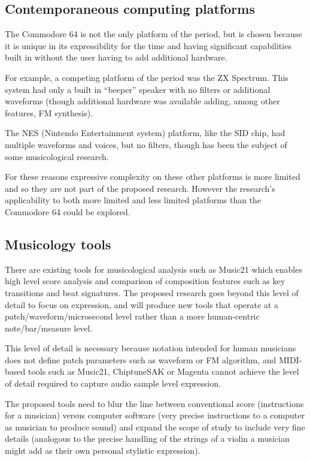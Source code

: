 \documentclass[10pt]{article}
\begin{document}
\begin{multicols*}{2}
\subsection{Contemporaneous computing platforms}

The Commodore 64 is not the only platform of the period, but is chosen because it is unique in its expressibility for the time and having significant capabilities built in without the user having to add additional hardware.

For example, a competing platform of the period was the ZX Spectrum\cite{attrclash}. This system had only a built in “beeper” speaker with no filters or additional waveforms (though additional hardware was available adding, among other features, FM synthesis).

The NES (Nintendo Entertainment system) platform, like the SID chip, had multiple waveforms and voices, but no filters, though has been the subject of some musicological research\cite{nesmusic}.

For these reasons expressive complexity on these other platforms is more limited and so they are not part of the proposed research. However the research's applicability to both more limited and less limited platforms than the Commodore 64 could be explored.

\subsection{Musicology tools}

There are existing tools for musicological analysis such as Music21\cite{music21} which enables high level score analysis and comparison of composition features such as key transitions and beat signatures. The proposed research goes beyond this level of detail to focus on expression, and will produce new tools that operate at a patch/waveform/microsecond level rather than a more human-centric note/bar/measure level.

This level of detail is necessary because notation intended for human musicians does not define patch parameters such as waveform or FM algorithm, and MIDI-based tools such as Music21, ChiptuneSAK\cite{ChiptuneSAK} or Magenta\cite{Magenta} cannot achieve the level of detail required to capture audio sample level expression.

The proposed tools need to blur the line between conventional score (instructions for a musician) versus computer software (very precise instructions to a computer as musician to produce sound) and expand the scope of study to include very fine details (analogous to the precise handling of the strings of a violin a musician might add as their own personal stylistic expression).


\end{multicols*}
\end{document}
